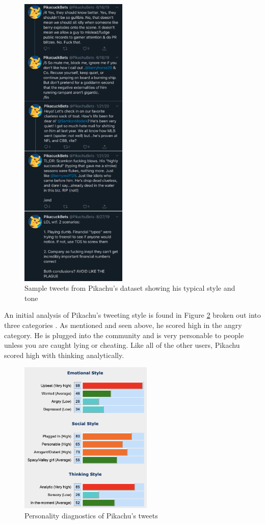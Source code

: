 \documentclass[5p,authoryear]{elsarticle}
\begin{document}
\begin{figure}[!htb] \centering
	\includegraphics[width=2.0in]{figures/tweet_pika.png}
	\caption[]{Sample tweets from Pikachu's dataset showing his typical style and tone} 
	\label{tweet pika} 
\end{figure}


An initial analysis of Pikachu’s tweeting style is found in Figure  \ref{pika_personality} broken out into three categories \citep{Anal_words}. As mentioned and seen above, he scored high in the angry category. He is plugged into the community and is very personable to people unless you are caught lying or cheating. Like all of the other users, Pikachu scored high with thinking analytically. 


\begin{figure}[!htb] \centering
	\includegraphics[width=2.5in]{figures/personality_Swim.png}
	\caption[]{Personality diagnostics of Pikachu’s tweets} 
	\label{pika_personality} 
\end{figure}
\end{document}
